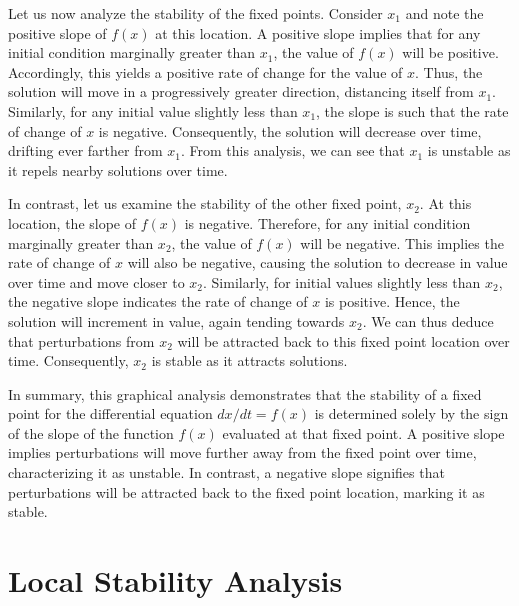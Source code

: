 Let us now analyze the stability of the fixed points. Consider $x_1$ and note the positive slope of $f(x)$ at this location. A positive slope implies that for any initial condition marginally greater than $x_1$, the value of $f(x)$ will be positive. Accordingly, this yields a positive rate of change for the value of $x$. Thus, the solution will move in a progressively greater direction, distancing itself from $x_1$. Similarly, for any initial value slightly less than $x_1$, the slope is such that the rate of change of $x$ is negative. Consequently, the solution will decrease over time, drifting ever farther from $x_1$. From this analysis, we can see that $x_1$ is unstable as it repels nearby solutions over time.

In contrast, let us examine the stability of the other fixed point, $x_2$. At this location, the slope of $f(x)$ is negative. Therefore, for any initial condition marginally greater than $x_2$, the value of $f(x)$ will be negative. This implies the rate of change of $x$ will also be negative, causing the solution to decrease in value over time and move closer to $x_2$. Similarly, for initial values slightly less than $x_2$, the negative slope indicates the rate of change of $x$ is positive. Hence, the solution will increment in value, again tending towards $x_2$. We can thus deduce that perturbations from $x_2$ will be attracted back to this fixed point location over time. Consequently, $x_2$ is stable as it attracts solutions.

In summary, this graphical analysis demonstrates that the stability of a fixed point for the differential equation $dx/dt=f(x)$ is determined solely by the sign of the slope of the function $f(x)$ evaluated at that fixed point. A positive slope implies perturbations will move further away from the fixed point over time, characterizing it as unstable. In contrast, a negative slope signifies that perturbations will be attracted back to the fixed point location, marking it as stable.

\section{Local Stability Analysis}

